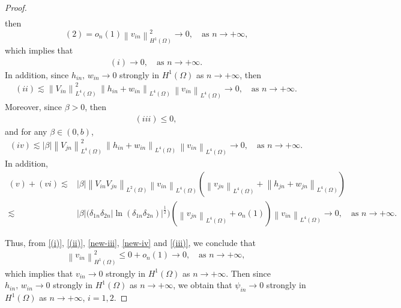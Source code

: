 \documentclass[a4paper,reqno,11pt,oneside]{amsart}
\numberwithin{equation}{section}
\begin{document}
\begin{proof}
\begin{align}
\end{align}
then  $$(2)= o_{n}(1)\left\|v_{in}\right\|_{H^1(\Omega)}^2\to 0,\quad\text{as $n \rightarrow+\infty$,}$$  which implies that \begin{align}
    \label{(i)}
    (i)\to 0,\quad\text{as $n \rightarrow+\infty$.}
\end{align}
In addition, since $h_{in},\,w_{in}\to 0$  strongly in \(H^{1}(\Omega)\) as $n \rightarrow+\infty$, then
\begin{align}
    \label{(ii)}
    (ii)\lesssim\left\|V_{in}\right\|^2_{L^4(\Omega)}\,\left\|h_{in}+w_{in}\right\|_{L^4(\Omega)}\,\left\|v_{in}\right\|_{L^4(\Omega)}\to 0,\quad\text{as $n \rightarrow+\infty$.}
\end{align}
Moreover, since $\beta>0$, then 
\begin{align}
    \label{new-iii}
    (iii)\leq 0,
\end{align}
and for any $\beta\in (0,b)$, 
\begin{align}\label{new-iv}
    (iv)\lesssim|\beta|\left\|V_{jn}\right\|^2_{L^4(\Omega)}\,\left\|h_{in}+w_{in}\right\|_{L^4(\Omega)}\,\left\|v_{in}\right\|_{L^4(\Omega)}\to 0,\quad\text{as $n \rightarrow+\infty$.}
\end{align}
In addition, 
\begin{align}
    \label{(iii)}
    (v)+(vi)\lesssim&|\beta|\left\|V_{in}V_{jn}\right\|_{L^2(\Omega)}\left\|v_{in}\right\|_{L^4(\Omega)}\left(\left\|v_{jn}\right\|_{L^4(\Omega)}+\left\|h_{jn}+w_{jn}\right\|_{L^4(\Omega)}\right)\nonumber\\\lesssim&|\beta|\Big(\delta_{1n}\delta_{2n}|\ln{\left(\delta_{1n}\delta_{2n}\right)}|^{\frac{1}{2}}\Big)\left(\left\|v_{jn}\right\|_{L^4(\Omega)}+o_n(1)\right)\left\|v_{in}\right\|_{L^4(\Omega)}\to 0,\quad\text{as $n \rightarrow+\infty$.}
\end{align}



Thus, from \eqref{(i)}, \eqref{(ii)}, \eqref{new-iii}, \eqref{new-iv} and  \eqref{(iii)}, we conclude that 
\begin{align*}
    \left\|v_{in}\right\|_{H^1(\Omega)}^2\leq 0+o_{n}(1)\to 0,\quad\text{as $n \rightarrow+\infty$},
\end{align*}
which implies that \( {v}_{in}\to 0 \) strongly in \(H^{1}(\Omega)\) as $n \rightarrow+\infty$. Then since $h_{in},\,w_{in}\to 0$  strongly in \(H^{1}(\Omega)\) as $n \rightarrow+\infty$, we obtain that
\( {\psi}_{in}\to 0 \) strongly in \(H^{1}(\Omega)\) as $n \rightarrow+\infty$, $i=1,2$. 


\end{proof}
\end{document}
